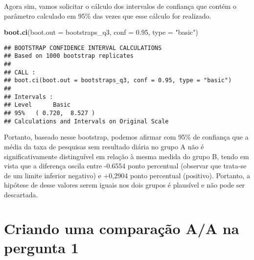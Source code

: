 \documentclass[]{article}
\newenvironment{Shaded}{\begin{snugshade}}{\end{snugshade}}
\newcommand{\KeywordTok}[1]{\textcolor[rgb]{0.13,0.29,0.53}{\textbf{#1}}}
\newcommand{\DataTypeTok}[1]{\textcolor[rgb]{0.13,0.29,0.53}{#1}}
\newcommand{\FloatTok}[1]{\textcolor[rgb]{0.00,0.00,0.81}{#1}}
\newcommand{\StringTok}[1]{\textcolor[rgb]{0.31,0.60,0.02}{#1}}
\newcommand{\NormalTok}[1]{#1}
\begin{document}
Agora sim, vamos solicitar o cálculo dos intervalos de confiança que
contém o parâmetro calculado em 95\% das vezes que esse cálculo for
realizado.

\begin{Shaded}
\begin{Highlighting}[]
\KeywordTok{boot.ci}\NormalTok{(}\DataTypeTok{boot.out =}\NormalTok{ bootstraps_q3, }\DataTypeTok{conf =} \FloatTok{0.95}\NormalTok{, }\DataTypeTok{type =} \StringTok{"basic"}\NormalTok{)}
\end{Highlighting}
\end{Shaded}

\begin{verbatim}
## BOOTSTRAP CONFIDENCE INTERVAL CALCULATIONS
## Based on 1000 bootstrap replicates
## 
## CALL : 
## boot.ci(boot.out = bootstraps_q3, conf = 0.95, type = "basic")
## 
## Intervals : 
## Level      Basic         
## 95%   ( 0.720,  8.527 )  
## Calculations and Intervals on Original Scale
\end{verbatim}

Portanto, baseado nesse bootstrap, podemos afirmar com 95\% de confiança
que a média da taxa de pesquisas sem resultado diária no grupo A não é
significativamente distinguível em relação à mesma medida do grupo B,
tendo em vista que a diferença oscila entre -0.6554 ponto percentual
(observar que trata-se de um limite inferior negativo) e +0,2904 ponto
percentual (positivo). Portanto, a hipótese de desse valores serem
iguais nos dois grupos é plausível e não pode ser descartada.

\section{Criando uma comparação A/A na pergunta
1}\label{criando-uma-comparacao-aa-na-pergunta-1}
\end{document}
